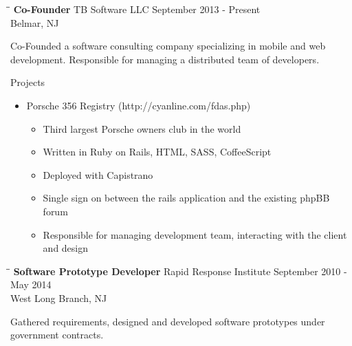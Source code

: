 \documentclass{res}
\begin{document}
\begin{resume}
   \begin{tabbing}
   \hspace{2.3in}\= \hspace{2.6in}\= \kill %
    {\bf Co-Founder} \>TB Software LLC     \>September 2013 - Present\\
                             \>Belmar, NJ
   \end{tabbing}\vspace{-20pt}      %
    Co-Founded a software consulting company specializing in mobile and web development. 
    Responsible for managing a distributed team of developers.

    Projects
    \begin{itemize}
        \item Porsche 356 Registry (http://cyanline.com/fdas.php)
        \begin{itemize}
            \item Third largest Porsche owners club in the world
            \item Written in Ruby on Rails, HTML, SASS, CoffeeScript
            \item Deployed with Capistrano
            \item Single sign on between the rails application and the existing phpBB forum
            \item Responsible for managing development team, interacting with the client and design
        \end{itemize}
    \end{itemize}

   \begin{tabbing}
   \hspace{2.3in}\= \hspace{2.6in}\= \kill %
    {\bf Software Prototype Developer} \>Rapid Response Institute     \>September 2010 - May 2014\\
                             \>West Long Branch, NJ
   \end{tabbing}\vspace{-20pt}      %
   Gathered requirements, designed and developed software prototypes under government contracts.


\end{resume}
\end{document}
